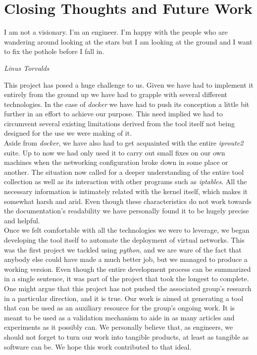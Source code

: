 \chapter{Closing Thoughts and Future Work}
    \epigraph{I am not a visionary. I'm an engineer. I'm happy with the people who are wandering around looking at the stars but I am
        looking at the ground and I want to fix the pothole before I fall in.}{\textit{Linus Torvalds}}

    This project has posed a huge challenge to us. Given we have had to implement it entirely from the ground up we have had to grapple with several different technologies. In the case of \textit{docker} we have had to push its conception a little bit further in an effort to achieve our purpose. This need implied we had to circumvent several existing limitations derived from the tool itself not being designed for the use we were making of it.\\

    Aside from \textit{docker}, we have also had to get acquainted with the entire \textit{iproute2} suite. Up to now we had only used it to carry out small fixes on our own machines when the networking configuration broke down in some place or another. The situation now called for a deeper understanding of the entire tool collection as well as its interaction with other programs such as \textit{iptables}. All the necessary information is intimately related with the kernel itself, which makes it somewhat harsh and arid. Even though these characteristics do not work towards the documentation's readability we have personally found it to be hugely precise and helpful.\\

    Once we felt comfortable with all the technologies we were to leverage, we began developing the tool itself to automate the deployment of virtual networks. This was the first project we tackled using \textit{python}, and we are ware of the fact that anybody else could have made a much better job, but we managed to produce a working version. Even though the entire development process can be summarized in a single sentence, it was part of the project that took the longest to complete.\\

    One might argue that this project has not pushed the associated group's research in a particular direction, and it is true. Our work is aimed at generating a tool that can be used as an auxiliary resource for the group's ongoing work. It is meant to be used as a validation mechanism to aide in as many articles and experiments as it possibly can. We personally believe that, as engineers, we should not forget to turn our work into tangible products, at least as tangible as software can be. We hope this work contributed to that ideal.\\

